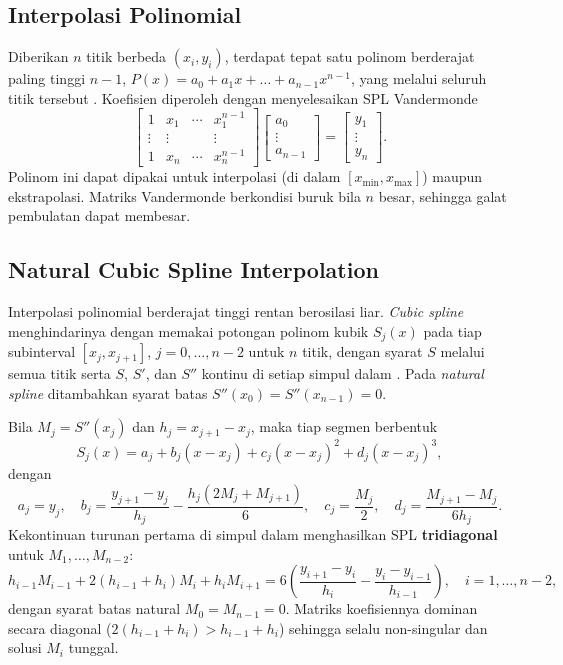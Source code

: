 \documentclass[12pt,a4paper]{article}
\begin{document}
\subsection{Interpolasi Polinomial}
Diberikan $n$ titik berbeda $(x_i,y_i)$, terdapat tepat satu polinom berderajat paling tinggi $n-1$,
$P(x)=a_0+a_1x+\dots+a_{n-1}x^{n-1}$, yang melalui seluruh titik tersebut \cite{burden}. Koefisien diperoleh dengan menyelesaikan SPL Vandermonde
\begin{equation}
  \begin{bmatrix}
    1 & x_1 & \cdots & x_1^{n-1}\\
    \vdots & \vdots & & \vdots\\
    1 & x_n & \cdots & x_n^{n-1}
  \end{bmatrix}
  \begin{bmatrix}a_0\\ \vdots\\ a_{n-1}\end{bmatrix}
  =
  \begin{bmatrix}y_1\\ \vdots\\ y_n\end{bmatrix}.
\end{equation}
Polinom ini dapat dipakai untuk interpolasi (di dalam $[x_{\min},x_{\max}]$) maupun ekstrapolasi. Matriks Vandermonde berkondisi buruk bila $n$ besar, sehingga galat pembulatan dapat membesar.

\subsection{Natural Cubic Spline Interpolation}
Interpolasi polinomial berderajat tinggi rentan berosilasi liar. \textit{Cubic spline} menghindarinya dengan memakai potongan polinom kubik $S_j(x)$ pada tiap subinterval $[x_j,x_{j+1}]$, $j=0,\dots,n-2$ untuk $n$ titik, dengan syarat $S$ melalui semua titik serta $S$, $S'$, dan $S''$ kontinu di setiap simpul dalam \cite{burden,deboor}. Pada \textit{natural spline} ditambahkan syarat batas $S''(x_0)=S''(x_{n-1})=0$.

Bila $M_j=S''(x_j)$ dan $h_j=x_{j+1}-x_j$, maka tiap segmen berbentuk
\begin{equation}
  S_j(x)=a_j+b_j(x-x_j)+c_j(x-x_j)^2+d_j(x-x_j)^3,
\end{equation}
dengan
\begin{equation}
  a_j=y_j,\quad
  b_j=\frac{y_{j+1}-y_j}{h_j}-\frac{h_j(2M_j+M_{j+1})}{6},\quad
  c_j=\frac{M_j}{2},\quad
  d_j=\frac{M_{j+1}-M_j}{6h_j}.
\end{equation}
Kekontinuan turunan pertama di simpul dalam menghasilkan SPL \textbf{tridiagonal} untuk $M_1,\dots,M_{n-2}$:
\begin{equation}
  h_{i-1}M_{i-1}+2(h_{i-1}+h_i)M_i+h_iM_{i+1}
  =6\left(\frac{y_{i+1}-y_i}{h_i}-\frac{y_i-y_{i-1}}{h_{i-1}}\right),
  \quad i=1,\dots,n-2,
\end{equation}
dengan syarat batas natural $M_0=M_{n-1}=0$. Matriks koefisiennya dominan secara diagonal ($2(h_{i-1}+h_i)>h_{i-1}+h_i$) sehingga selalu non-singular dan solusi $M_i$ tunggal.
\end{document}
